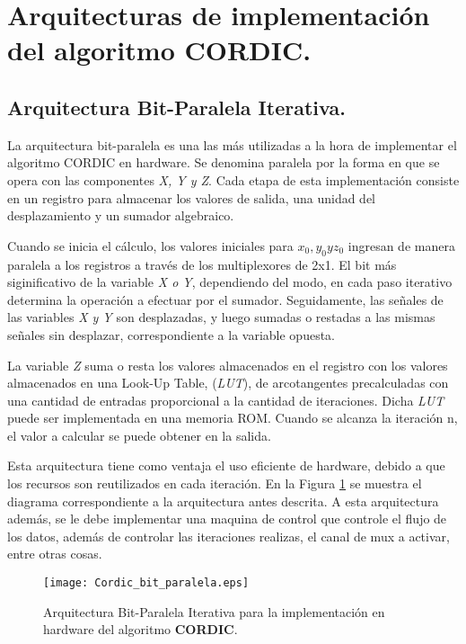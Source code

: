 \section{Arquitecturas de implementación del algoritmo \textbf{CORDIC}.}

\subsection{Arquitectura Bit-Paralela Iterativa.}

La arquitectura bit-paralela es una las más utilizadas a la hora de implementar el algoritmo CORDIC en hardware. Se denomina paralela por la forma en que se opera con las componentes \textit{X, Y y Z}. Cada etapa de esta implementación consiste en un registro para almacenar los valores de salida, una unidad del desplazamiento y un sumador algebraico. 

Cuando se inicia el cálculo, los valores iniciales para $x_{0}, y_{0} y z_{0}$ ingresan de manera paralela a los registros a través de los multiplexores de 2x1. El bit más siginificativo de la variable \textit{X o Y}, dependiendo del modo, en cada paso iterativo determina la operación a efectuar por el sumador. Seguidamente, las señales de las variables \textit{X y Y} son desplazadas, y luego sumadas o restadas a las mismas señales sin desplazar, correspondiente a la variable opuesta. 

La variable \textit{Z} suma o resta los valores almacenados en el registro con los valores almacenados en una Look-Up Table, (\textit{LUT}), de arcotangentes precalculadas con una cantidad de entradas proporcional a la cantidad de iteraciones. Dicha \textit{LUT} puede ser implementada en una memoria ROM. Cuando se alcanza la iteración n, el valor a calcular se puede obtener en la salida. 

Esta arquitectura tiene como ventaja el uso eficiente de hardware, debido a que los recursos son reutilizados en cada iteración. En la Figura \ref{fig:bit_paralela} se muestra el diagrama correspondiente a la arquitectura antes descrita. A esta arquitectura además, se le debe implementar una maquina de control que controle el flujo de los datos, además de controlar las iteraciones realizas, el canal de mux a activar, entre otras cosas.

\begin{figure}[htb]
  \centering
  \texttt{[image: Cordic\_bit\_paralela.eps]}
  \caption{Arquitectura Bit-Paralela Iterativa para la implementación en hardware del algoritmo \textbf{CORDIC}.}
  \label{fig:bit_paralela}
\end{figure}

